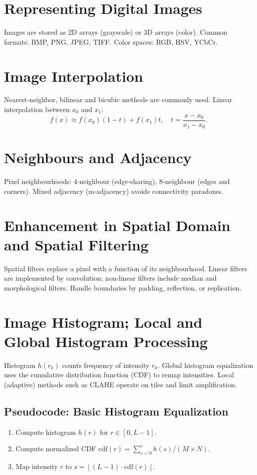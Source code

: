 \documentclass[12pt,a4paper]{article}
\begin{document}
\section{Representing Digital Images}
Images are stored as 2D arrays (grayscale) or 3D arrays (color). Common formats: BMP, PNG, JPEG, TIFF. Color spaces: RGB, HSV, YCbCr.

\section{Image Interpolation}
Nearest-neighbor, bilinear and bicubic methods are commonly used. Linear interpolation between $x_0$ and $x_1$:
\[ f(x) \approx f(x_0)(1-t) + f(x_1) t, \quad t=\frac{x-x_0}{x_1-x_0}. \]

\section{Neighbours and Adjacency}
Pixel neighbourhoods: 4-neighbour (edge-sharing), 8-neighbour (edges and corners). Mixed adjacency (m-adjacency) avoids connectivity paradoxes.

\section{Enhancement in Spatial Domain and Spatial Filtering}
Spatial filters replace a pixel with a function of its neighbourhood. Linear filters are implemented by convolution; non-linear filters include median and morphological filters. Handle boundaries by padding, reflection, or replication.

\section{Image Histogram; Local and Global Histogram Processing}
Histogram $h(r_k)$ counts frequency of intensity $r_k$. Global histogram equalization uses the cumulative distribution function (CDF) to remap intensities. Local (adaptive) methods such as CLAHE operate on tiles and limit amplification.

\subsection*{Pseudocode: Basic Histogram Equalization}
\begin{enumerate}
  \item Compute histogram $h(r)$ for $r\in[0,L-1]$.
  \item Compute normalized CDF $\mathrm{cdf}(r)=\sum_{s=0}^r h(s)/(M\times N)$.
  \item Map intensity $r$ to $s=\left\lfloor (L-1)\cdot \mathrm{cdf}(r) \right\rfloor$.
\end{enumerate}
\end{document}
